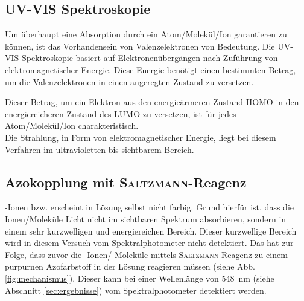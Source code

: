 \subsection*{UV-VIS Spektroskopie}
Um überhaupt eine Absorption durch ein Atom/Molekül/Ion garantieren zu können, ist das Vorhandensein von Valenzelektronen von Bedeutung. Die UV-VIS-Spektroskopie basiert auf Elektronenübergängen nach Zuführung von elektromagnetischer Energie. Diese Energie benötigt einen bestimmten Betrag, um die Valenzelektronen in einen angeregten Zustand zu versetzen. 

\newpage

Dieser Betrag, um ein Elektron aus den energieärmeren Zustand HOMO in den energiereicheren Zustand des LUMO zu versetzen, ist für jedes Atom/Molekül/Ion charakteristisch. \\
Die Strahlung, in Form von elektromagnetischer Energie, liegt bei diesem Verfahren im ultravioletten bis sichtbarem Bereich.

\subsection*{Azokopplung mit \textsc{Saltzmann}-Reagenz}
-Ionen bzw.  erscheint in Lösung selbst nicht farbig. Grund hierfür ist, dass die Ionen/Moleküle Licht nicht im sichtbaren Spektrum absorbieren, sondern in einem sehr kurzwelligen und energiereichen Bereich. Dieser kurzwellige Bereich wird in diesem Versuch vom Spektralphotometer nicht detektiert. Das hat zur Folge, dass zuvor die -Ionen/-Moleküle mittels \textsc{Saltzmann}-Reagenz zu einem purpurnen Azofarbstoff in der Lösung reagieren müssen (siehe Abb.\ref{fig:mechanismus}). Dieser kann bei einer Wellenlänge von \SI{548}{\nano \meter} (siehe Abschnitt \ref{sec:ergebnisse}) vom Spektralphotometer detektiert werden.






